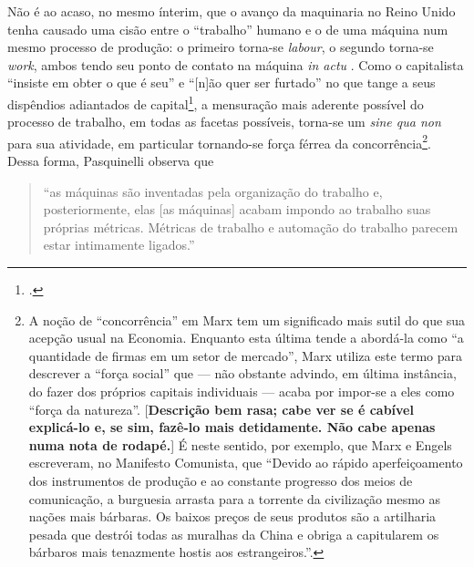 Não é ao acaso, no mesmo ínterim, que o avanço da maquinaria no Reino Unido tenha causado uma cisão entre o ``trabalho'' humano e o de uma máquina num mesmo processo de produção: o primeiro torna-se \textit{labour}, o segundo torna-se \textit{work}, ambos tendo seu ponto de contato na máquina \textit{in actu} \parencite[p. 11]{Pasquinelli2022}. Como o capitalista ``insiste em obter o que é seu'' e ``[n]ão quer ser furtado'' no que tange a seus dispêndios adiantados de capital\footnote{\textcite[p. 272]{Marx2017}.}, a mensuração mais aderente possível do processo de trabalho, em todas as facetas possíveis, torna-se um \textit{sine qua non} para sua atividade, em particular tornando-se força férrea da concorrência\footnote{A noção de ``concorrência'' em Marx tem um significado mais sutil do que sua acepção usual na Economia. Enquanto esta última tende a abordá-la como ``a quantidade de firmas em um setor de mercado'', Marx utiliza este termo para descrever a ``força social'' que --- não obstante advindo, em última instância, do fazer dos próprios capitais individuais --- acaba por impor-se a eles como ``força da natureza''. [\textbf{Descrição bem rasa; cabe ver se é cabível explicá-lo e, se sim, fazê-lo mais detidamente. Não cabe apenas numa nota de rodapé.}] É neste sentido, por exemplo, que Marx e Engels escreveram, no Manifesto Comunista, que ``Devido ao rápido aperfeiçoamento dos instrumentos de produção e ao constante progresso dos meios de comunicação, a burguesia arrasta para a torrente da civilização mesmo as nações mais bárbaras. Os baixos preços de seus produtos são a artilharia pesada que destrói todas as muralhas da China e obriga a capitularem os bárbaros mais tenazmente hostis aos estrangeiros.''.}. Dessa forma, Pasquinelli observa que

\begin{quote}
    ``as máquinas são inventadas pela organização do trabalho e, posteriormente, elas [as máquinas] acabam impondo ao trabalho suas próprias métricas. Métricas de trabalho e automação do trabalho parecem estar intimamente ligados.'' \parencite[p. 7]{Pasquinelli2022}
\end{quote}

